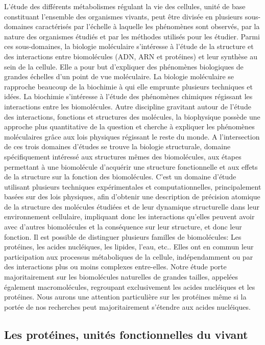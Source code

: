 L'étude des différents métabolismes régulant la vie des cellules, unité de base constituant l'ensemble des organismes vivants, peut être divisée en plusieurs sous-domaines caractérisés par l'échelle à laquelle les phénomènes sont observés, par la nature des organismes étudiés et par les méthodes utilisés pour les étudier. Parmi ces sous-domaines, la biologie moléculaire s'intéresse à l'étude de la structure et des interactions entre biomolécules (ADN, ARN et protéines) et leur synthèse au sein de la cellule. Elle a pour but d'expliquer des phénomènes biologiques de grandes échelles d'un point de vue moléculaire. La biologie moléculaire se rapproche beaucoup de la biochimie à qui elle emprunte plusieurs techniques et idées. La biochimie s'intéresse à l'étude des phénomènes chimiques régissant les interactions entre les biomolécules. Autre discipline gravitant autour de l'étude des interactions, fonctions et structures des molécules, la biophysique possède une approche plus quantitative de la question et cherche à expliquer les phénomènes moléculaires grâce aux lois physiques régissant le reste du monde. A l'intersection de ces trois domaines d'études se trouve la biologie structurale, domaine spécifiquement intéressé aux structures mêmes des biomolécules, aux étapes permettant à une biomolécule d'acquérir une structure fonctionnelle et aux effets de la structure sur la fonction des biomolécules. C'est un domaine d'étude utilisant plusieurs techniques expérimentales et computationnelles, principalement basées sur des lois physiques, afin d'obtenir une description de précision atomique de la structure des molécules étudiées et de leur dynamique structurelle dans leur environnement cellulaire, impliquant donc les interactions qu'elles peuvent avoir avec d'autres biomolécules et la conséquence sur leur structure, et donc leur fonction.
Il est possible de distinguer plusieurs familles de biomolécules: Les protéines, les acides nucléiques, les lipides, l'eau, etc.. Elles ont en commun leur participation aux processus métaboliques de la cellule, indépendamment ou par des interactions plus ou moins complexes entre-elles. Notre étude porte majoritairement sur les biomolécules naturelles de grandes tailles, appelées également macromolécules, regroupant exclusivement les acides nucléiques et les protéines. Nous aurons une attention particulière sur les protéines même si la portée de nos recherches peut majoritairement s'étendre aux acides nucléiques.

\subsection{Les protéines, unités fonctionnelles du vivant}

